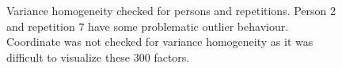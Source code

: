 \documentclass[11pt,fleqn]{article}
\begin{document}
\begin{figure}[H]
	\centering
	\caption{Variance homogeneity checked for persons and repetitions. Person 2 and repetition 7 have some problematic outlier behaviour. Coordinate was not checked for variance homogeneity as it was difficult to visualize these 300 factors. }
	\label{fig:vars}
\end{figure}
\end{document}
